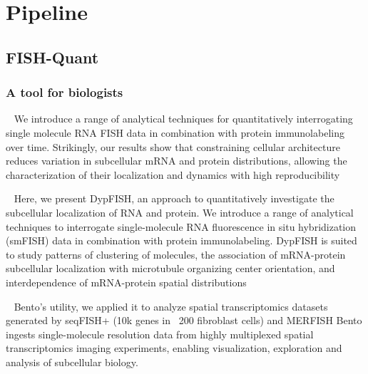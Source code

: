 
\graphicspath{{../../figures/chapter_1/}}

\part{Pipeline}
\chapter{FISH-Quant} \label{chap:chapter_1}
\minitoc
\newpage


\section{A tool for biologists}




~\cite{savulescu_dypfish_2019}
We introduce a range of analytical techniques for quantitatively interrogating
single molecule RNA FISH data in combination with protein immunolabeling over time.
Strikingly, our results show that constraining cellular architecture reduces
variation in subcellular mRNA and protein distributions, allowing the
characterization of their localization and dynamics with high reproducibility

~\cite{savulescu_interrogating_2021}
Here, we present DypFISH, an approach to quantitatively investigate the
subcellular localization of RNA and protein. We introduce a range of analytical
techniques to interrogate single-molecule RNA fluorescence in situ hybridization
(smFISH) data in combination with protein immunolabeling. DypFISH is suited to
study patterns of clustering of molecules, the association of mRNA-protein
subcellular localization with microtubule organizing center orientation, and
interdependence of mRNA-protein spatial distributions


~\cite{mah_bento_2022}
Bento’s utility, we applied it to analyze spatial transcriptomics datasets generated by seqFISH+ (10k genes in ~200 fibroblast cells) and MERFISH
Bento ingests single-molecule resolution data from highly multiplexed
spatial transcriptomics imaging experiments, enabling visualization, exploration and analysis of subcellular
biology.

